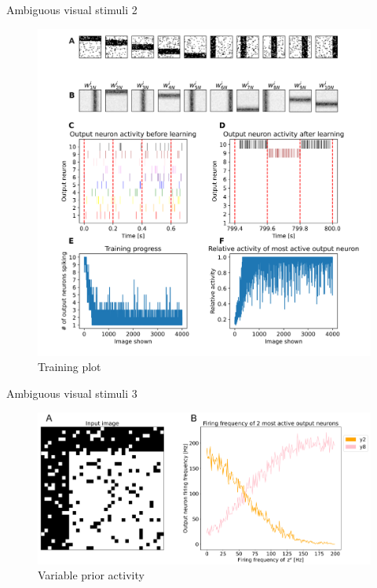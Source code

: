 \documentclass[aspectratio=169]{beamer}
\begin{document}
\begin{frame}{Ambiguous visual stimuli 2}
\vspace{-1.0cm}
        \begin{figure}
        \includegraphics[width=0.40\linewidth]{../Latex/figures/horvertAdaptiveInh/trainingPlotCropped.png}
      \\   \footnotesize Training plot
      \end{figure} 
\end{frame}


\begin{frame}{Ambiguous visual stimuli 3}
		\begin{figure}
        \includegraphics[width=0.7\linewidth]{../Latex/figures/horvertAdaptiveInh/YFrequency_prior.png}
      \\   \scriptsize Variable prior activity
      \end{figure} 
\end{frame}
\end{document}
